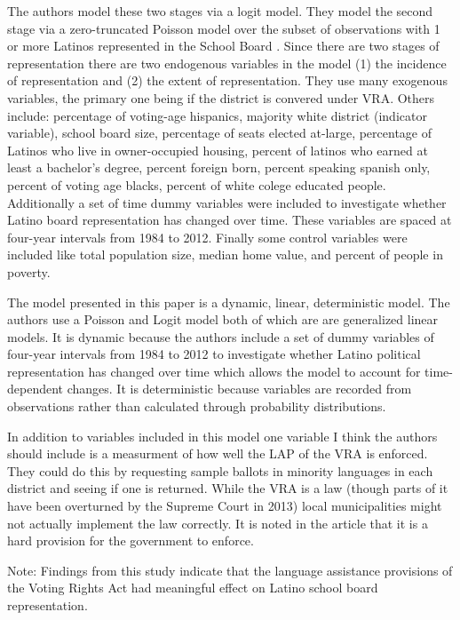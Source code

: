 \documentclass{article}
\begin{document}
The authors model these two stages via a logit model.  They model the second stage via a zero-truncated Poisson model over the subset of observations with 1 or more Latinos represented in the School Board .  Since there are two stages of representation there are two endogenous variables in the model (1) the incidence of representation and (2) the extent of representation.  They use many exogenous variables, the primary one being if the district is convered under VRA.  Others include: percentage of voting-age hispanics, majority white district (indicator variable), school board size, percentage of seats elected at-large, percentage of Latinos who live in owner-occupied housing, percent of latinos who earned at least a bachelor's degree, percent foreign born, percent speaking spanish only, percent of voting age blacks, percent of white colege educated people.  Additionally a set of time dummy variables were included to investigate whether Latino board representation has changed over time.  These variables are spaced at four-year intervals from 1984 to 2012.  Finally some control variables were included like total population size, median home value, and percent of people in poverty.
\vspace{5mm}

The model presented in this paper is a dynamic, linear, deterministic model.  The authors use a Poisson and Logit model both of which are are generalized linear models.  It is dynamic because the authors include a set of dummy variables of four-year intervals from 1984 to 2012 to investigate whether Latino political representation has changed over time which allows the model to account for time-dependent changes.  It is deterministic because variables are recorded from observations rather than calculated through probability distributions.
\vspace{5mm}

In addition to variables included in this model one variable I think the authors should include is a measurment of how well the LAP of the VRA is enforced.  They could do this by requesting sample ballots in minority languages in each district and seeing if one is returned.  While the VRA is a law (though parts of it have been overturned by the Supreme Court in 2013) local municipalities might not  actually implement the law correctly.  It is noted in the article that it is a hard provision for the government to enforce.
\vspace{5mm}

Note: Findings from this study indicate that the language assistance provisions of the Voting Rights Act had meaningful effect on Latino school board representation.
\end{document}
